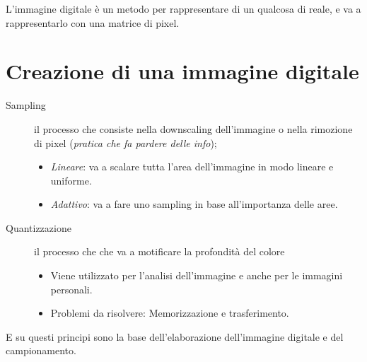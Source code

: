 \documentclass{report}
\begin{document}
L'immagine digitale è un metodo per rappresentare di un qualcosa di
reale, e va a rappresentarlo con una matrice di pixel.

\section{Creazione di una immagine digitale}
\label{sec:creadiunimgdig}

\begin{description}
\item[Sampling] il processo che consiste nella downscaling dell'immagine
  o nella rimozione di pixel (\textit{pratica che fa pardere
    delle info});
  \begin{itemize}
  \item \textit{Lineare}: va a scalare tutta l'area dell'immagine in
    modo lineare e uniforme.
  \item \textit{Adattivo}: va a fare uno sampling in base all'importanza
    delle aree.
  \end{itemize}
\item[Quantizzazione] il processo che che va a motificare la profondità
  del colore
  \begin{itemize}
  \item Viene utilizzato per l'analisi dell'immagine e anche per le
    immagini personali.
  \item Problemi da risolvere: Memorizzazione e trasferimento.
  \end{itemize}
\end{description}
E su questi principi sono la base dell'elaborazione dell'immagine
digitale e del campionamento.
\end{document}
